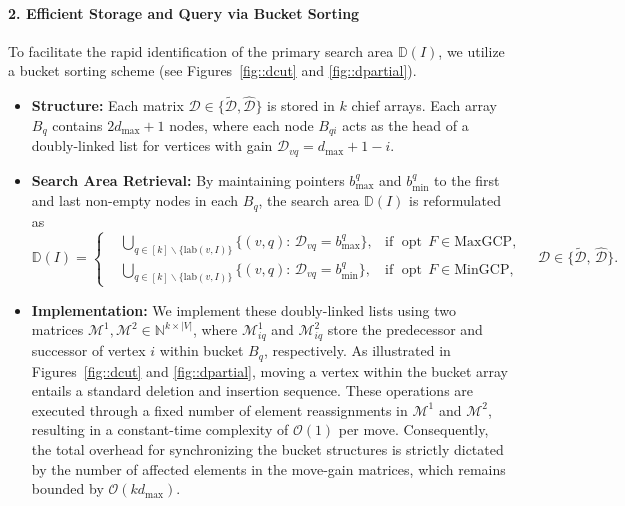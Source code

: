 \documentclass[12pt, a4paper]{article}%
\DeclareMathOperator*{\opt}{\ensuremath{opt}}
\newcommand{\labeling}{\ensuremath{\mathrm{lab}}}
\numberwithin{equation}{section}
\theoremstyle{plain}
\begin{document}
		\paragraph{2. Efficient Storage and Query via Bucket Sorting}
		To facilitate the rapid identification of the primary search area $\mathbb{D}(I)$, we utilize a bucket sorting scheme (see Figures~\ref{fig::dcut} and \ref{fig::dpartial}). 
		\begin{itemize}
			\item \textbf{Structure:} Each matrix $\mathcal{D} \in \{\widetilde{\mathcal{D}}, \widehat{\mathcal{D}}\}$ is stored in $k$ chief arrays. Each array $B_q$ contains $2d_{\max}+1$ nodes, where each node $B_{qi}$ acts as the head of a doubly-linked list for vertices with gain $\mathcal{D}_{vq} = d_{\max} + 1 - i$. 
			\item \textbf{Search Area Retrieval:} By maintaining pointers $b_{\max}^q$ and $b_{\min}^q$ to the first and last non-empty nodes in each $B_q$, the search area $\mathbb{D}(I)$ is reformulated as 	\begin{equation}
				\label{eq::normalized-move}
				\mathbb{D}(I)=\left\{
				\begin{aligned}
					&\bigcup_{q\in[k]\backslash\{\labeling(v,I)\}}\{(v,q):\,\mathcal{D}_{vq}=b_{\max}^q\},&\text{if }\opt\,F\in\text{MaxGCP},\\
					&\bigcup_{q\in[k]\backslash\{\labeling(v,I)\}}\{(v,q):\,\mathcal{D}_{vq}=b_{\min}^q\},&\text{if }\opt\,F\in\text{MinGCP},
				\end{aligned}
				\right.
				\quad \mathcal{D}\in\{\widetilde{\mathcal{D}},\,\widehat{\mathcal{D}}\}.
			\end{equation}		
		\item \textbf{Implementation:} We implement these doubly-linked lists using two matrices $\mathcal{M}^1, \mathcal{M}^2 \in \mathbb{N}^{k \times |V|}$, where $\mathcal{M}_{iq}^1$ and $\mathcal{M}_{iq}^2$ store the predecessor and successor of vertex $i$ within bucket $B_q$, respectively. As illustrated in Figures~\ref{fig::dcut} and \ref{fig::dpartial}, moving a vertex within the bucket array entails a standard deletion and insertion sequence. These operations are executed through a fixed number of element reassignments in $\mathcal{M}^1$ and $\mathcal{M}^2$, resulting in a constant-time complexity of $\mathcal{O}(1)$ per move. Consequently, the total overhead for synchronizing the bucket structures is strictly dictated by the number of affected elements in the move-gain matrices, which remains bounded by $\mathcal{O}(kd_{\max})$.
		\end{itemize}
		
\end{document}
